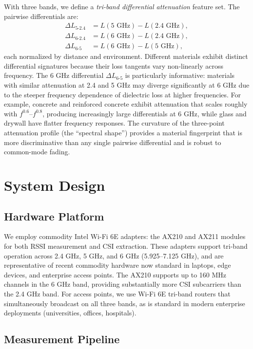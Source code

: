\documentclass[conference]{IEEEtran}
\begin{document}
With three bands, we define a \textit{tri-band differential attenuation} feature set. The pairwise differentials are:
\begin{align}
\Delta L_{5\text{-}2.4} &= L(5\text{ GHz}) - L(2.4\text{ GHz}), \\
\Delta L_{6\text{-}2.4} &= L(6\text{ GHz}) - L(2.4\text{ GHz}), \\
\Delta L_{6\text{-}5} &= L(6\text{ GHz}) - L(5\text{ GHz}),
\end{align}
each normalized by distance and environment. Different materials exhibit distinct differential signatures because their loss tangents vary non-linearly across frequency. The 6 GHz differential $\Delta L_{6\text{-}5}$ is particularly informative: materials with similar attenuation at 2.4 and 5 GHz may diverge significantly at 6 GHz due to the steeper frequency dependence of dielectric loss at higher frequencies. For example, concrete and reinforced concrete exhibit attenuation that scales roughly with $f^{0.6}$--$f^{0.8}$, producing increasingly large differentials at 6 GHz, while glass and drywall have flatter frequency responses. The curvature of the three-point attenuation profile (the ``spectral shape'') provides a material fingerprint that is more discriminative than any single pairwise differential and is robust to common-mode fading.

\section{System Design}

\subsection{Hardware Platform}

We employ commodity Intel Wi-Fi 6E adapters: the AX210 and AX211 modules for both RSSI measurement and CSI extraction. These adapters support tri-band operation across 2.4 GHz, 5 GHz, and 6 GHz (5.925--7.125 GHz), and are representative of recent commodity hardware now standard in laptops, edge devices, and enterprise access points. The AX210 supports up to 160 MHz channels in the 6 GHz band, providing substantially more CSI subcarriers than the 2.4 GHz band. For access points, we use Wi-Fi 6E tri-band routers that simultaneously broadcast on all three bands, as is standard in modern enterprise deployments (universities, offices, hospitals).

\subsection{Measurement Pipeline}
\end{document}

